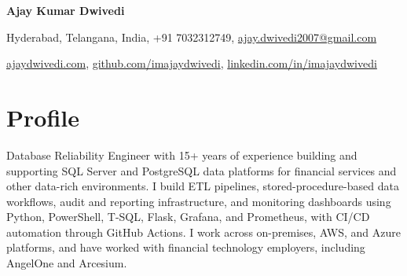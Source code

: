 \documentclass[10pt,a4paper]{article}
\begin{document}
\begin{center}
{\Huge\bfseries Ajay Kumar Dwivedi}

\vspace{6pt}
Hyderabad, Telangana, India, +91 7032312749, \href{mailto:ajay.dwivedi2007@gmail.com}{ajay.dwivedi2007@gmail.com}

\vspace{2pt}
\href{https://ajaydwivedi.com/}{ajaydwivedi.com}, \href{https://github.com/imajaydwivedi}{github.com/imajaydwivedi}, \href{https://linkedin.com/in/imajaydwivedi/}{linkedin.com/in/imajaydwivedi}
\end{center}

\section{Profile}
Database Reliability Engineer with 15+ years of experience building and supporting SQL Server and PostgreSQL data platforms for financial services and other data-rich environments. I build ETL pipelines, stored-procedure-based data workflows, audit and reporting infrastructure, and monitoring dashboards using Python, PowerShell, T-SQL, Flask, Grafana, and Prometheus, with CI/CD automation through GitHub Actions. I work across on-premises, AWS, and Azure platforms, and have worked with financial technology employers, including AngelOne and Arcesium.
\end{document}
